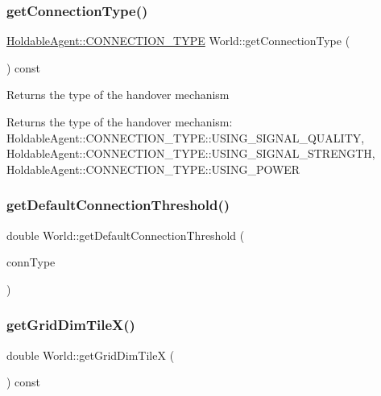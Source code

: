 \subsubsection{\texorpdfstring{getConnectionType()}{getConnectionType()}}
{\footnotesize\ttfamily \mbox{\hyperlink{class_holdable_agent_ae2c334b004d7b9c5a999cf2618e4e518}{Holdable\+Agent\+::\+C\+O\+N\+N\+E\+C\+T\+I\+O\+N\+\_\+\+T\+Y\+PE}} World\+::get\+Connection\+Type (\begin{DoxyParamCaption}{ }\end{DoxyParamCaption}) const}

Returns the type of the handover mechanism

\begin{DoxyReturn}{Returns}
the type of the handover mechanism\+: Holdable\+Agent\+::\+C\+O\+N\+N\+E\+C\+T\+I\+O\+N\+\_\+\+T\+Y\+P\+E\+::\+U\+S\+I\+N\+G\+\_\+\+S\+I\+G\+N\+A\+L\+\_\+\+Q\+U\+A\+L\+I\+TY, Holdable\+Agent\+::\+C\+O\+N\+N\+E\+C\+T\+I\+O\+N\+\_\+\+T\+Y\+P\+E\+::\+U\+S\+I\+N\+G\+\_\+\+S\+I\+G\+N\+A\+L\+\_\+\+S\+T\+R\+E\+N\+G\+TH, Holdable\+Agent\+::\+C\+O\+N\+N\+E\+C\+T\+I\+O\+N\+\_\+\+T\+Y\+P\+E\+::\+U\+S\+I\+N\+G\+\_\+\+P\+O\+W\+ER 
\end{DoxyReturn}
\mbox{\label{class_world_a5975f2673e84c87f8640737efd04590b}} 
\subsubsection{\texorpdfstring{getDefaultConnectionThreshold()}{getDefaultConnectionThreshold()}}
{\footnotesize\ttfamily double World\+::get\+Default\+Connection\+Threshold (\begin{DoxyParamCaption}\item[{\mbox{\hyperlink{class_holdable_agent_ae2c334b004d7b9c5a999cf2618e4e518}{Holdable\+Agent\+::\+C\+O\+N\+N\+E\+C\+T\+I\+O\+N\+\_\+\+T\+Y\+PE}}}]{conn\+Type }\end{DoxyParamCaption})\hspace{0.3cm}{\ttfamily [private]}}

\mbox{\label{class_world_aa62f6cd42214191e37b904a672306888}} 
\subsubsection{\texorpdfstring{getGridDimTileX()}{getGridDimTileX()}}
{\footnotesize\ttfamily double World\+::get\+Grid\+Dim\+TileX (\begin{DoxyParamCaption}{ }\end{DoxyParamCaption}) const}

